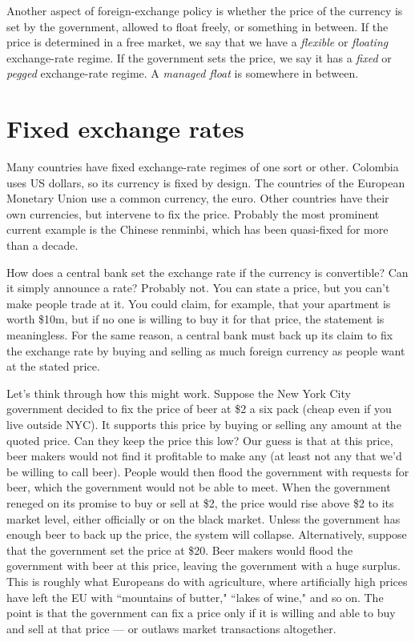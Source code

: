 Another aspect of foreign-exchange policy
is whether the price of the currency is set by the government,
allowed to float freely, or something in between.
If the price is determined in a free market, we say that we have a
{\it flexible\/} or {\it floating\/} exchange-rate regime. 
If the government sets the price, we say it has a
{\it fixed\/} or {\it pegged\/} exchange-rate regime. 
A {\it managed float\/} is somewhere in between. 


\section{Fixed exchange rates}

Many countries have fixed exchange-rate regimes of one sort or other.
Colombia uses US dollars, so its currency is fixed by design. %
The countries of the European Monetary Union use a common currency, the euro.
Other countries have their own currencies, but intervene to
fix the price.
Probably the most prominent current example is the Chinese renminbi,
which has been quasi-fixed for more than a decade.


How does a central bank  set the exchange rate if the currency
 is convertible?
Can it simply announce a rate?
Probably not.
You can state a price, but you can't make people trade at it.
You could claim, for example, that your apartment is worth
\$10m, but if no one is willing to buy it for that price,
the statement is meaningless.
For the same reason, a central bank  must back up its
claim to fix the exchange rate by buying and selling as much
foreign currency as people want at the stated price.


Let's think through how this might work.
Suppose the New York City government decided to fix the price of beer at \$2 a six pack (cheap even if you live outside NYC).
It supports this price by buying or selling
any amount at the quoted price.  Can they keep the price this low?
Our guess is that at this price,
beer makers would not find it profitable to make any
(at least not any that we'd be willing to call beer).  People would then flood the government with requests for beer, which the government would
not be able to meet.  When the government reneged on its promise to buy or sell at \$2, the price
would rise above \$2 to its market level, either officially or on the black market.
Unless the government has enough beer to back up the price,
the system will collapse.
Alternatively, suppose that the government set the price at \$20.
Beer makers would flood the government with beer at this price, leaving the
government with a huge surplus.  This is roughly what Europeans do with agriculture, where artificially high prices have left the EU with
``mountains of butter," ``lakes of wine," and so on.
The point is that the government can fix a price
only if it is willing and able to buy and sell at that price --- or outlaws market transactions altogether.

